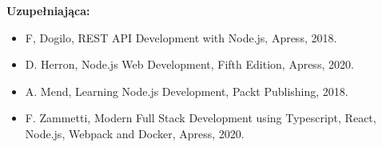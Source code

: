 \documentclass[12pt, a4paper]{article}
\begin{document}
\textbf{Uzupełniająca:}
\begin{itemize}
  \item F, Dogilo, REST API Development with Node.js, Apress, 2018.
  \item D. Herron, Node.js Web Development, Fifth Edition, Apress, 2020.
  \item A. Mend, Learning Node.js Development, Packt Publishing, 2018.
  \item F. Zammetti, Modern Full Stack Development using Typescript, React, Node.js, Webpack and Docker, Apress, 2020.
\end{itemize}
\end{document}
